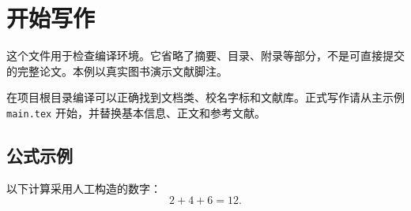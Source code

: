 \documentclass{cuebthesis}
\begin{document}
\maketitle
\cuebfrontmatter
\cuebmainmatter
\section{开始写作}
这个文件用于检查编译环境。它省略了摘要、目录、附录等部分，不是可直接提交的完整论文。本例以真实图书演示文献脚注。

在项目根目录编译可以正确找到文档类、校名字标和文献库。正式写作请从主示例 \texttt{main.tex} 开始，并替换基本信息、正文和参考文献。
\subsection{公式示例}
以下计算采用人工构造的数字：
\begin{equation}
  2+4+6=12.
\end{equation}
\cuebprintbibliography
\end{document}
